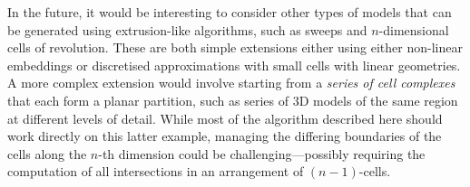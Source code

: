 In the future, it would be interesting to consider other types of models that can be generated using extrusion-like algorithms, such as sweeps and $n$-dimensional cells of revolution.
These are both simple extensions either using either non-linear embeddings or discretised approximations with small cells with linear geometries.
A more complex extension would involve starting from a \emph{series of cell complexes} that each form a planar partition, such as series of 3D models of the same region at different levels of detail.
While most of the algorithm described here should work directly on this latter example, managing the differing boundaries of the cells along the $n$-th dimension could be challenging---possibly requiring the computation of all intersections in an arrangement of $(n-1)$-cells.